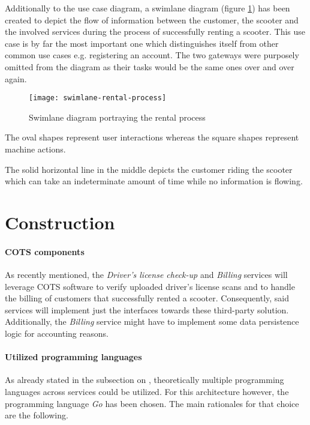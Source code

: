 \documentclass[12pt,a4paper,twoside]{report}
\begin{document}
Additionally to the use case diagram, a swimlane diagram
(figure \ref{fig:swimlane-rental-process}) has been created to depict
the flow of information between the customer, the scooter and the
involved services during the process of successfully renting a scooter.
This use case is by far the most important one which distinguishes itself
from other common use cases e.g. registering an account.
The two gateways were purposely omitted from the diagram as their tasks would
be the same ones over and over again.

\begin{figure}[htbp]
\centering
\texttt{[image: swimlane-rental-process]}
\caption{Swimlane diagram portraying the rental process}
\label{fig:swimlane-rental-process}
\end{figure}

The oval shapes represent user interactions whereas the square shapes represent
machine actions.

The solid horizontal line in the middle depicts the customer riding the scooter
which can take an indeterminate amount of time while no information is flowing.


\section{Construction} \label{subsect:analysis-construction}

\paragraph{COTS components}
As recently mentioned, the \textit{Driver's license check-up} and \textit{Billing}
services will leverage COTS software to verify uploaded driver's license scans
and to handle the billing of customers that successfully rented a scooter.
Consequently, said services will implement just the interfaces towards these
third-party solution. Additionally, the \textit{Billing} service might have
to implement some data persistence logic for accounting reasons.

\paragraph{Utilized programming languages}
As already stated in the subsection on \textit{},
theoretically multiple programming languages across services could be utilized.
For this architecture however, the programming language \textit{Go} has been chosen.
The main rationales for that choice are the following.
\end{document}
